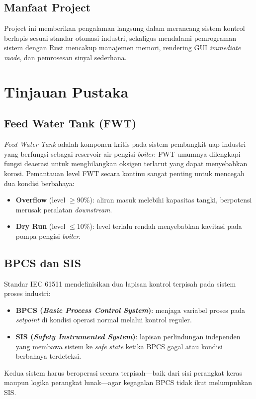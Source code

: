 \documentclass[12pt,a4paper]{article}
\begin{document}
\subsection{Manfaat Project}
Project ini memberikan pengalaman langsung dalam merancang sistem kontrol
berlapis sesuai standar otomasi industri, sekaligus mendalami pemrograman
sistem dengan Rust mencakup manajemen memori, rendering GUI \textit{immediate
mode}, dan pemrosesan sinyal sederhana.

\section{Tinjauan Pustaka}

\subsection{Feed Water Tank (FWT)}
\textit{Feed Water Tank} adalah komponen kritis pada sistem pembangkit uap
industri yang berfungsi sebagai reservoir air pengisi \textit{boiler}. FWT
umumnya dilengkapi fungsi deaerasi untuk menghilangkan oksigen terlarut yang
dapat menyebabkan korosi. Pemantauan level FWT secara kontinu sangat penting
untuk mencegah dua kondisi berbahaya:
\begin{itemize}
    \item \textbf{Overflow} (level $\geq 90\%$): aliran masuk melebihi
          kapasitas tangki, berpotensi merusak peralatan \textit{downstream}.
    \item \textbf{Dry Run} (level $\leq 10\%$): level terlalu rendah
          menyebabkan kavitasi pada pompa pengisi \textit{boiler}.
\end{itemize}

\subsection{BPCS dan SIS}
Standar IEC 61511 mendefinisikan dua lapisan kontrol terpisah pada sistem
proses industri:
\begin{itemize}
    \item \textbf{BPCS (\textit{Basic Process Control System})}: menjaga
          variabel proses pada \textit{setpoint} di kondisi operasi normal
          melalui kontrol reguler.
    \item \textbf{SIS (\textit{Safety Instrumented System})}: lapisan
          perlindungan independen yang membawa sistem ke \textit{safe state}
          ketika BPCS gagal atau kondisi berbahaya terdeteksi.
\end{itemize}
Kedua sistem harus beroperasi secara terpisah---baik dari sisi perangkat
keras maupun logika perangkat lunak---agar kegagalan BPCS tidak ikut
melumpuhkan SIS.
\end{document}
